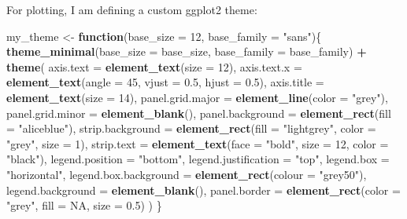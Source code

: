 \documentclass[]{book}
\newenvironment{Shaded}{\begin{snugshade}}{\end{snugshade}}
\newcommand{\ControlFlowTok}[1]{\textcolor[rgb]{0.13,0.29,0.53}{\textbf{#1}}}
\newcommand{\DataTypeTok}[1]{\textcolor[rgb]{0.13,0.29,0.53}{#1}}
\newcommand{\DecValTok}[1]{\textcolor[rgb]{0.00,0.00,0.81}{#1}}
\newcommand{\FloatTok}[1]{\textcolor[rgb]{0.00,0.00,0.81}{#1}}
\newcommand{\KeywordTok}[1]{\textcolor[rgb]{0.13,0.29,0.53}{\textbf{#1}}}
\newcommand{\NormalTok}[1]{#1}
\newcommand{\OperatorTok}[1]{\textcolor[rgb]{0.81,0.36,0.00}{\textbf{#1}}}
\newcommand{\OtherTok}[1]{\textcolor[rgb]{0.56,0.35,0.01}{#1}}
\newcommand{\StringTok}[1]{\textcolor[rgb]{0.31,0.60,0.02}{#1}}
\begin{document}
For plotting, I am defining a custom ggplot2 theme:

\begin{Shaded}
\begin{Highlighting}[]
\NormalTok{my_theme <-}\StringTok{ }\ControlFlowTok{function}\NormalTok{(}\DataTypeTok{base_size =} \DecValTok{12}\NormalTok{, }\DataTypeTok{base_family =} \StringTok{"sans"}\NormalTok{)\{}
  \KeywordTok{theme_minimal}\NormalTok{(}\DataTypeTok{base_size =}\NormalTok{ base_size, }\DataTypeTok{base_family =}\NormalTok{ base_family) }\OperatorTok{+}
\StringTok{  }\KeywordTok{theme}\NormalTok{(}
    \DataTypeTok{axis.text =} \KeywordTok{element_text}\NormalTok{(}\DataTypeTok{size =} \DecValTok{12}\NormalTok{),}
    \DataTypeTok{axis.text.x =} \KeywordTok{element_text}\NormalTok{(}\DataTypeTok{angle =} \DecValTok{45}\NormalTok{, }\DataTypeTok{vjust =} \FloatTok{0.5}\NormalTok{, }\DataTypeTok{hjust =} \FloatTok{0.5}\NormalTok{),}
    \DataTypeTok{axis.title =} \KeywordTok{element_text}\NormalTok{(}\DataTypeTok{size =} \DecValTok{14}\NormalTok{),}
    \DataTypeTok{panel.grid.major =} \KeywordTok{element_line}\NormalTok{(}\DataTypeTok{color =} \StringTok{"grey"}\NormalTok{),}
    \DataTypeTok{panel.grid.minor =} \KeywordTok{element_blank}\NormalTok{(),}
    \DataTypeTok{panel.background =} \KeywordTok{element_rect}\NormalTok{(}\DataTypeTok{fill =} \StringTok{"aliceblue"}\NormalTok{),}
    \DataTypeTok{strip.background =} \KeywordTok{element_rect}\NormalTok{(}\DataTypeTok{fill =} \StringTok{"lightgrey"}\NormalTok{, }\DataTypeTok{color =} \StringTok{"grey"}\NormalTok{, }\DataTypeTok{size =} \DecValTok{1}\NormalTok{),}
    \DataTypeTok{strip.text =} \KeywordTok{element_text}\NormalTok{(}\DataTypeTok{face =} \StringTok{"bold"}\NormalTok{, }\DataTypeTok{size =} \DecValTok{12}\NormalTok{, }\DataTypeTok{color =} \StringTok{"black"}\NormalTok{),}
    \DataTypeTok{legend.position =} \StringTok{"bottom"}\NormalTok{,}
    \DataTypeTok{legend.justification =} \StringTok{"top"}\NormalTok{, }
    \DataTypeTok{legend.box =} \StringTok{"horizontal"}\NormalTok{,}
    \DataTypeTok{legend.box.background =} \KeywordTok{element_rect}\NormalTok{(}\DataTypeTok{colour =} \StringTok{"grey50"}\NormalTok{),}
    \DataTypeTok{legend.background =} \KeywordTok{element_blank}\NormalTok{(),}
    \DataTypeTok{panel.border =} \KeywordTok{element_rect}\NormalTok{(}\DataTypeTok{color =} \StringTok{"grey"}\NormalTok{, }\DataTypeTok{fill =} \OtherTok{NA}\NormalTok{, }\DataTypeTok{size =} \FloatTok{0.5}\NormalTok{)}
\NormalTok{  )}
\NormalTok{\}}
\end{Highlighting}
\end{Shaded}
\end{document}
